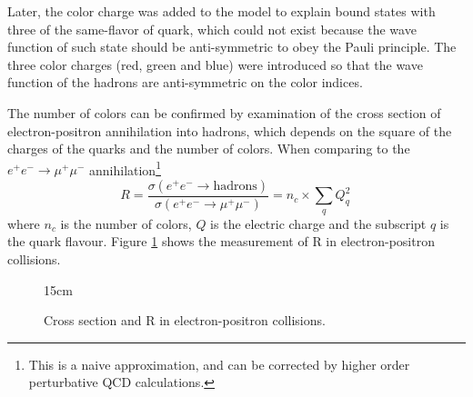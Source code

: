 Later, the color charge was added to the model to explain bound states with three of the same-flavor of quark, which could not exist because the wave function of such state should be anti-symmetric to obey the Pauli principle. The three color charges (red, green and blue) were introduced so that the wave function of the hadrons are anti-symmetric on the color indices.

The number of colors can be confirmed by examination of the cross section of electron-positron annihilation into hadrons, which depends on the square of the charges of the quarks and the number of colors. When comparing to the $e^+e^- \rightarrow \mu^+\mu^-$ annihilation\footnote{This is a naive approximation, and can be corrected by higher order perturbative QCD calculations.}
\begin{equation}
    R = \frac{\sigma(e^+e^- \rightarrow \text{hadrons})}{\sigma(e^+e^- \rightarrow \mu^+\mu^-)} = n_c \times \sum_q Q_q^2\,
\end{equation}
where $n_c$ is the number of colors, $Q$ is the electric charge and the subscript $q$ is the quark flavour. Figure \ref{fig:Rsigma} shows the measurement of R in electron-positron collisions.

\begin{figure}[!htm]{15cm}
\caption{Cross section and R in electron-positron collisions.}%
\label{fig:Rsigma}
\end{figure}

